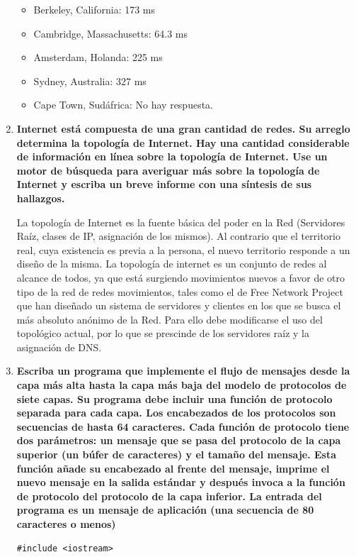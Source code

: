 \documentclass[a4paper,12pt]{article}
\begin{document}
\begin{enumerate}
\begin{itemize}
 \item Berkeley, California: 173 ms
 \item Cambridge, Massachusetts: 64.3 ms
 \item Amsterdam, Holanda: 225 ms
 \item Sydney, Australia: 327 ms
 \item Cape Town, Sudáfrica: No hay respuesta.
\end{itemize}

 \item \textbf{Internet está compuesta de una gran cantidad de redes. Su arreglo determina la topología de Internet. Hay
una cantidad considerable de información en línea sobre la topología de Internet. Use un motor de búsqueda
para averiguar más sobre la topología de Internet y escriba un breve informe con una síntesis de sus
hallazgos.}

La topología de Internet es la fuente básica del poder en la Red (Servidores Raíz, clases de IP, asignación de los mismos). Al contrario que el territorio real, cuya existencia es previa a la persona, el nuevo territorio responde a un diseño de la misma.
La topología de internet es un conjunto de redes al alcance de todos, ya que está surgiendo movimientos nuevos a favor de otro tipo de la red de redes movimientos, tales como
el de Free Network Project que han diseñado un sistema de servidores y clientes en los que se busca el más absoluto anónimo de la Red. Para ello debe modificarse el uso del topológico actual, por lo que se prescinde de los servidores raíz y la asignación de DNS.

 \item \textbf{Escriba un programa que implemente el flujo de mensajes desde la capa más alta hasta la capa más baja del
modelo de protocolos de siete capas. Su programa debe incluir una función de protocolo separada para cada
capa. Los encabezados de los protocolos son secuencias de hasta 64 caracteres. Cada función de protocolo tiene
dos parámetros: un mensaje que se pasa del protocolo de la capa superior (un búfer de caracteres) y el tamaño
del mensaje. Esta función añade su encabezado al frente del mensaje, imprime el nuevo mensaje en la salida
estándar y después invoca a la función de protocolo del protocolo de la capa inferior. La entrada del programa es
un mensaje de aplicación (una secuencia de 80 caracteres o menos)}

\begin{lstlisting}
#include <iostream>


\end{lstlisting}
\end{enumerate}
\end{document}
